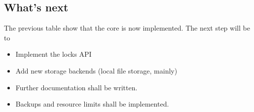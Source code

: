 
\subsection{What's next}

The previous table show that the core is now implemented. The next step will be to 

\begin{itemize}
    \item Implement the locks API
    \item Add new storage backends (local file storage, mainly)
    \item Further documentation shall be written.
    \item Backups and resource limits shall be implemented.
\end{itemize}
